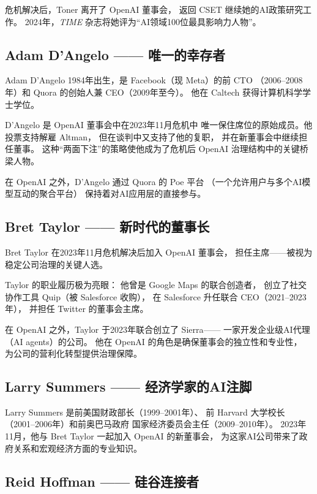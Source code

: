 危机解决后，Toner 离开了 OpenAI 董事会，
返回 CSET 继续她的AI政策研究工作。
2024年，\emph{TIME} 杂志将她评为``AI领域100位最具影响力人物''。


\subsection{Adam D'Angelo —— 唯一的幸存者}
\label{subsec:adam-dangelo}

Adam D'Angelo 1984年出生，是 Facebook（现 Meta）的前 CTO
（2006--2008年）和 Quora 的创始人兼 CEO（2009年至今）。
他在 Caltech 获得计算机科学学士学位。

D'Angelo 是 OpenAI 董事会中在2023年11月危机中
唯一保住席位的原始成员。他投票支持解雇 Altman，
但在谈判中又支持了他的复职，
并在新董事会中继续担任董事。
这种``两面下注''的策略使他成为了危机后 OpenAI 治理结构中的关键桥梁人物。

在 OpenAI 之外，D'Angelo 通过 Quora 的 Poe 平台
（一个允许用户与多个AI模型互动的聚合平台）
保持着对AI应用层的直接参与。


\subsection{Bret Taylor —— 新时代的董事长}
\label{subsec:bret-taylor}

Bret Taylor 在2023年11月危机解决后加入 OpenAI 董事会，
担任主席——被视为稳定公司治理的关键人选。

Taylor 的职业履历极为亮眼：
他曾是 Google Maps 的联合创造者，
创立了社交协作工具 Quip（被 Salesforce 收购），
在 Salesforce 升任联合 CEO（2021--2023年），
并担任 Twitter 的董事会主席。

在 OpenAI 之外，Taylor 于2023年联合创立了 Sierra——
一家开发企业级AI代理（AI agents）的公司。
他在 OpenAI 的角色是确保董事会的独立性和专业性，
为公司的营利化转型提供治理保障。


\subsection{Larry Summers —— 经济学家的AI注脚}
\label{subsec:larry-summers}

Larry Summers 是前美国财政部长（1999--2001年）、
前 Harvard 大学校长（2001--2006年）和前奥巴马政府
国家经济委员会主任（2009--2010年）。
2023年11月，他与 Bret Taylor 一起加入 OpenAI 的新董事会，
为这家AI公司带来了政府关系和宏观经济方面的专业知识。


\subsection{Reid Hoffman —— 硅谷连接者}
\label{subsec:reid-hoffman}

